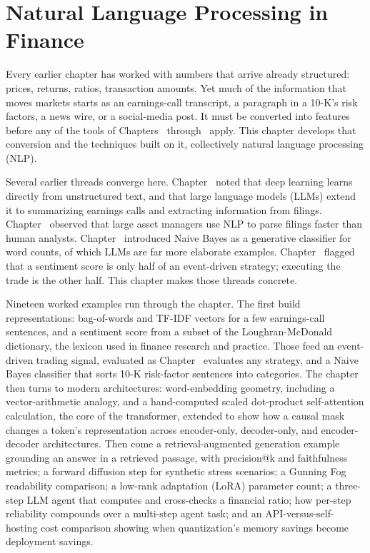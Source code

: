 \documentclass[../ai_in_finance]{subfiles}
\begin{document}
\chapter{Natural Language Processing in Finance}

Every earlier chapter has worked with numbers that arrive already structured: prices, returns, ratios, transaction amounts. Yet much of the information that moves markets starts as an earnings-call transcript, a paragraph in a 10-K's risk factors, a news wire, or a social-media post. It must be converted into features before any of the tools of Chapters~ through~ apply. This chapter develops that conversion and the techniques built on it, collectively natural language processing (NLP).

Several earlier threads converge here. Chapter~ noted that deep learning learns directly from unstructured text, and that large language models (LLMs) extend it to summarizing earnings calls and extracting information from filings. Chapter~ observed that large asset managers use NLP to parse filings faster than human analysts. Chapter~ introduced Naive Bayes as a generative classifier for word counts, of which LLMs are far more elaborate examples. Chapter~ flagged that a sentiment score is only half of an event-driven strategy; executing the trade is the other half. This chapter makes those threads concrete.

Nineteen worked examples run through the chapter. The first build representations: bag-of-words and TF-IDF vectors for a few earnings-call sentences, and a sentiment score from a subset of the Loughran-McDonald dictionary, the lexicon used in finance research and practice. Those feed an event-driven trading signal, evaluated as Chapter~ evaluates any strategy, and a Naive Bayes classifier that sorts 10-K risk-factor sentences into categories. The chapter then turns to modern architectures: word-embedding geometry, including a vector-arithmetic analogy, and a hand-computed scaled dot-product self-attention calculation, the core of the transformer, extended to show how a causal mask changes a token's representation across encoder-only, decoder-only, and encoder-decoder architectures. Then come a retrieval-augmented generation example grounding an answer in a retrieved passage, with precision@k and faithfulness metrics; a forward diffusion step for synthetic stress scenarios; a Gunning Fog readability comparison; a low-rank adaptation (LoRA) parameter count; a three-step LLM agent that computes and cross-checks a financial ratio; how per-step reliability compounds over a multi-step agent task; and an API-versus-self-hosting cost comparison showing when quantization's memory savings become deployment savings.
\end{document}
